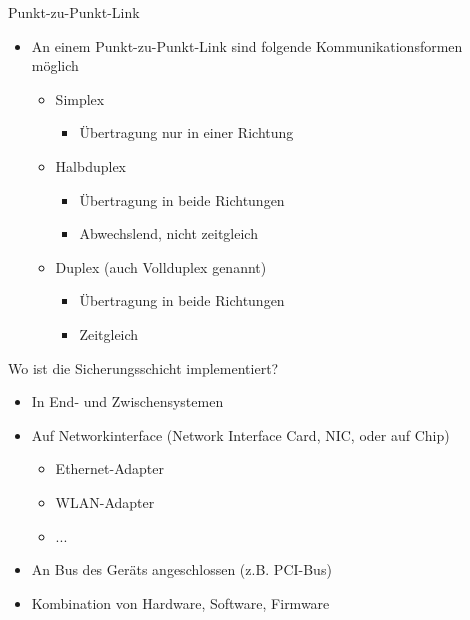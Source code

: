     Punkt-zu-Punkt-Link
    \begin{itemize}
      \item An einem Punkt-zu-Punkt-Link sind folgende Kommunikationsformen möglich
        \begin{itemize}
          \item Simplex
            \begin{itemize}
              \item Übertragung nur in einer Richtung
            \end{itemize}
          \item Halbduplex
            \begin{itemize}
              \item Übertragung in beide Richtungen
              \item Abwechslend, nicht zeitgleich
            \end{itemize}
          \item Duplex (auch Vollduplex genannt)
            \begin{itemize}
              \item Übertragung in beide Richtungen
              \item Zeitgleich
            \end{itemize}
        \end{itemize}
    \end{itemize}
    Wo ist die Sicherungsschicht implementiert?
    \begin{itemize}
      \item In End- und Zwischensystemen
      \item Auf Networkinterface (Network Interface Card, NIC, oder auf Chip)
        \begin{itemize}
          \item Ethernet-Adapter
          \item WLAN-Adapter
          \item ...
        \end{itemize}
      \item An Bus des Geräts angeschlossen (z.B. PCI-Bus)
      \item Kombination von Hardware, Software, Firmware
    \end{itemize}
